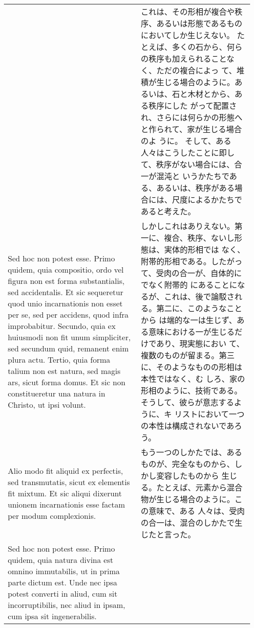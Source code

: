 \documentclass[10pt]{jsarticle} %
\begin{document}
\begin{longtable}{p{21em}p{21em}}
&

これは、その形相が複合や秩序、あるいは形態であるものにおいてしか生じえない。
 たとえば、多くの石から、何らの秩序も加えられることなく、ただの複合によっ
 て、堆積が生じる場合のように。あるいは、石と木材とから、ある秩序にした
 がって配置され、さらには何らかの形態へと作られて、家が生じる場合のよ
 うに。
そして、ある人々はこうしたことに即して、秩序がない場合には、合一が混沌と
 いうかたちである、あるいは、秩序がある場合には、尺度によるかたちであると考えた。



\\


Sed hoc non potest esse. Primo quidem, quia
compositio, ordo vel figura non est forma substantialis, sed
accidentalis. Et sic sequeretur quod unio incarnationis non esset per
se, sed per accidens, quod infra improbabitur. Secundo, quia ex
huiusmodi non fit unum simpliciter, sed secundum quid, remanent enim
plura actu. Tertio, quia forma talium non est natura, sed magis ars,
sicut forma domus. Et sic non constitueretur una natura in Christo, ut
ipsi volunt. 

&

しかしこれはありえない。第一に、複合、秩序、ないし形態は、実体的形相では
 なく、附帯的形相である。したがって、受肉の合一が、自体的にでなく附帯的
 にあることになるが、これは、後で論駁される。第二に、このようなことから
 は端的な一は生じず、ある意味における一が生じるだけであり、現実態におい
 て、複数のものが留まる。第三に、そのようなものの形相は本性ではなく、む
 しろ、家の形相のように、技術である。そうして、彼らが意志するように、キ
 リストにおいて一つの本性は構成されないであろう。


\\


Alio modo fit aliquid ex perfectis, sed transmutatis, sicut
ex elementis fit mixtum. Et sic aliqui dixerunt unionem incarnationis
esse factam per modum complexionis. 


&

もう一つのしかたでは、あるものが、完全なものから、しかし変容したものから
 生じる。たとえば、元素から混合物が生じる場合のように。この意味で、ある
 人々は、受肉の合一は、混合のしかたで生じたと言った。


\\


Sed hoc non potest esse. Primo
quidem, quia natura divina est omnino immutabilis, ut in prima parte
dictum est. Unde nec ipsa potest converti in aliud, cum sit
incorruptibilis, nec aliud in ipsam, cum ipsa sit
ingenerabilis. 



\end{longtable}
\end{document}

